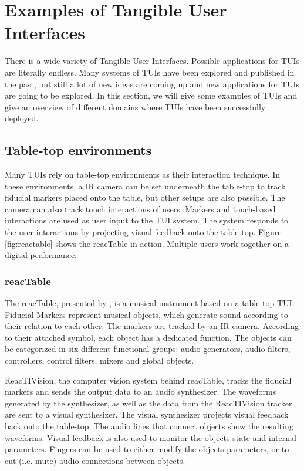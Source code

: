 \section{Examples of Tangible User Interfaces}
There is a wide variety of Tangible User Interfaces. Possible applications for TUIs are literally endless. Many systems of TUIs have been explored and published in the past, but still a lot of new ideas are coming up and new applications for TUIs are going to be explored. In this section, we will give some examples of TUIs and give an overview of different domains where TUIs have been successfully deployed.

\subsection{Table-top environments}
\label{sec:tabletop}
Many TUIs rely on table-top environments as their interaction technique. In these environments, a IR camera can be set underneath the table-top to track fiducial markers placed onto the table, but other setups are also possible. The camera can also track touch interactions of users. Markers and touch-based interactions are used as user input to the TUI system. The system responds to the user interactions by projecting visual feedback onto the table-top. Figure \ref{fig:reactable} shows the reacTable in action. Multiple users work together on a digital performance.

\subsubsection{reacTable}
The reacTable, presented by \cite{jorda07}, is a musical instrument based on a table-top TUI. Fiducial Markers represent musical objects, which generate sound according to their relation to each other. The markers are tracked by an IR camera. According to their attached symbol, each object has a dedicated function. The objects can be categorized in six different functional groups: audio generators, audio filters, controllers, control filters, mixers and global objects.

ReacTIVision, the computer vision system behind reacTable, tracks the fiducial markers and sends the output data to an audio synthesizer. The waveforms generated by the synthesizer, as well as the data from the ReacTIVision tracker are sent to a visual synthesizer. The visual synthesizer projects visual feedback back onto the table-top. The audio lines that connect objects show the resulting waveforms. Visual feedback is also used to monitor the objects state and internal parameters. Fingers can be used to either modify the objects parameters, or to cut (i.e. mute) audio connections between objects.

